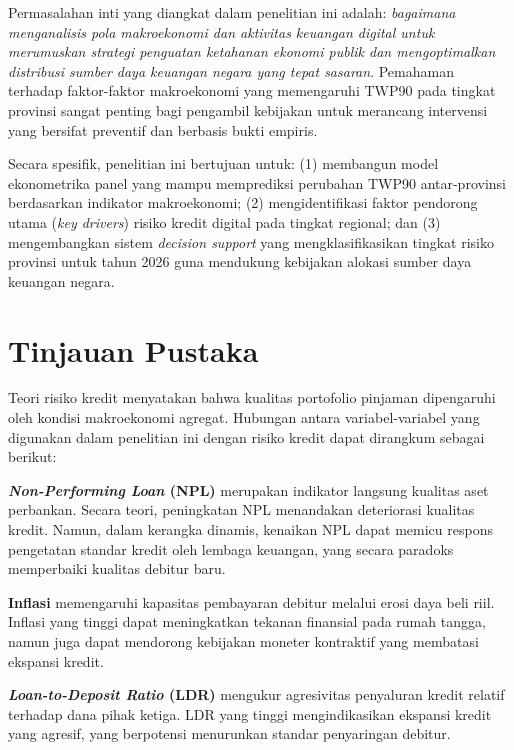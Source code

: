 \documentclass[12pt,a4paper]{article}
\begin{document}
Permasalahan inti yang diangkat dalam penelitian ini adalah: \textit{bagaimana menganalisis pola makroekonomi dan aktivitas keuangan digital untuk merumuskan strategi penguatan ketahanan ekonomi publik dan mengoptimalkan distribusi sumber daya keuangan negara yang tepat sasaran}. Pemahaman terhadap faktor-faktor makroekonomi yang memengaruhi TWP90 pada tingkat provinsi sangat penting bagi pengambil kebijakan untuk merancang intervensi yang bersifat preventif dan berbasis bukti empiris.

Secara spesifik, penelitian ini bertujuan untuk: (1) membangun model ekonometrika panel yang mampu memprediksi perubahan TWP90 antar-provinsi berdasarkan indikator makroekonomi; (2) mengidentifikasi faktor pendorong utama (\textit{key drivers}) risiko kredit digital pada tingkat regional; dan (3) mengembangkan sistem \textit{decision support} yang mengklasifikasikan tingkat risiko provinsi untuk tahun 2026 guna mendukung kebijakan alokasi sumber daya keuangan negara.

\section{Tinjauan Pustaka}

Teori risiko kredit menyatakan bahwa kualitas portofolio pinjaman dipengaruhi oleh kondisi makroekonomi agregat. Hubungan antara variabel-variabel yang digunakan dalam penelitian ini dengan risiko kredit dapat dirangkum sebagai berikut:

\textbf{\textit{Non-Performing Loan} (NPL)} merupakan indikator langsung kualitas aset perbankan. Secara teori, peningkatan NPL menandakan deteriorasi kualitas kredit. Namun, dalam kerangka dinamis, kenaikan NPL dapat memicu respons pengetatan standar kredit oleh lembaga keuangan, yang secara paradoks memperbaiki kualitas debitur baru.

\textbf{Inflasi} memengaruhi kapasitas pembayaran debitur melalui erosi daya beli riil. Inflasi yang tinggi dapat meningkatkan tekanan finansial pada rumah tangga, namun juga dapat mendorong kebijakan moneter kontraktif yang membatasi ekspansi kredit.

\textbf{\textit{Loan-to-Deposit Ratio} (LDR)} mengukur agresivitas penyaluran kredit relatif terhadap dana pihak ketiga. LDR yang tinggi mengindikasikan ekspansi kredit yang agresif, yang berpotensi menurunkan standar penyaringan debitur.
\end{document}
